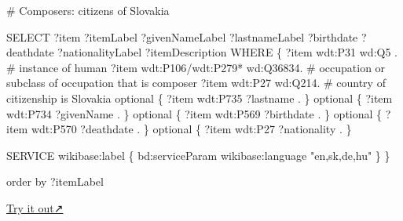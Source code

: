\documentclass[
  letterpaper,
  DIV=11,
  numbers=noendperiod]{scrreprt}
\newenvironment{Shaded}{\begin{snugshade}}{\end{snugshade}}
\newcommand{\CommentTok}[1]{\textcolor[rgb]{0.37,0.37,0.37}{#1}}
\newcommand{\NormalTok}[1]{\textcolor[rgb]{0.00,0.23,0.31}{#1}}
\newcommand{\SpecialCharTok}[1]{\textcolor[rgb]{0.37,0.37,0.37}{#1}}
\newcommand{\StringTok}[1]{\textcolor[rgb]{0.13,0.47,0.30}{#1}}
\begin{document}
\begin{Shaded}
\begin{Highlighting}[]
\CommentTok{\# Composers: citizens of Slovakia}

\NormalTok{SELECT ?item ?itemLabel  ?givenNameLabel ?lastnameLabel ?birthdate ?deathdate ?nationalityLabel ?itemDescription WHERE \{}
\NormalTok{    ?item wdt}\SpecialCharTok{:}\NormalTok{P31 wd}\SpecialCharTok{:}\NormalTok{Q5 .                }\CommentTok{\# instance of human}
\NormalTok{    ?item wdt}\SpecialCharTok{:}\NormalTok{P106}\SpecialCharTok{/}\NormalTok{wdt}\SpecialCharTok{:}\NormalTok{P279}\SpecialCharTok{*}\NormalTok{ wd}\SpecialCharTok{:}\NormalTok{Q36834.  }\CommentTok{\# occupation or subclass of occupation that is composer}
\NormalTok{    ?item wdt}\SpecialCharTok{:}\NormalTok{P27 wd}\SpecialCharTok{:}\NormalTok{Q214.               }\CommentTok{\# country of citizenship is Slovakia  }
\NormalTok{    optional \{ ?item wdt}\SpecialCharTok{:}\NormalTok{P735 ?lastname . \}}
\NormalTok{    optional \{ ?item wdt}\SpecialCharTok{:}\NormalTok{P734 ?givenName . \}}
\NormalTok{    optional \{ ?item wdt}\SpecialCharTok{:}\NormalTok{P569 ?birthdate . \}}
\NormalTok{    optional \{ ?item wdt}\SpecialCharTok{:}\NormalTok{P570 ?deathdate . \}}
\NormalTok{    optional \{ ?item wdt}\SpecialCharTok{:}\NormalTok{P27 ?nationality . \}}

\NormalTok{  SERVICE wikibase}\SpecialCharTok{:}\NormalTok{label \{ bd}\SpecialCharTok{:}\NormalTok{serviceParam wikibase}\SpecialCharTok{:}\NormalTok{language }\StringTok{"en,sk,de,hu"}\NormalTok{ \}}
\NormalTok{\}}

\NormalTok{order by ?itemLabel}
\end{Highlighting}
\end{Shaded}

\href{https://query.wikidata.org/\#\%23\%20Composers\%3A\%20citizens\%20of\%20Slovakia\%0A\%0ASELECT\%20\%3Fitem\%20\%3FitemLabel\%20\%20\%3FgivenNameLabel\%20\%3FlastnameLabel\%20\%3Fbirthdate\%20\%3Fdeathdate\%20\%3FnationalityLabel\%20\%3FitemDescription\%20WHERE\%20\%7B\%0A\%20\%20\%20\%20\%3Fitem\%20wdt\%3AP31\%20wd\%3AQ5\%20.\%20\%20\%20\%20\%20\%20\%20\%20\%20\%20\%20\%20\%20\%20\%20\%20\%23\%20instance\%20of\%20human\%0A\%20\%20\%20\%20\%3Fitem\%20wdt\%3AP106\%2Fwdt\%3AP279\%2a\%20wd\%3AQ36834.\%20\%20\%23\%20occupation\%20or\%20subclass\%20of\%20occupation\%20that\%20is\%20composer\%0A\%20\%20\%20\%20\%3Fitem\%20wdt\%3AP27\%20wd\%3AQ214.\%20\%20\%20\%20\%20\%20\%20\%20\%20\%20\%20\%20\%20\%20\%20\%23\%20country\%20of\%20citizenship\%20is\%20Slovakia\%20\%20\%0A\%20\%20\%20\%20optional\%20\%7B\%20\%3Fitem\%20wdt\%3AP735\%20\%3Flastname\%20.\%20\%7D\%0A\%20\%20\%20\%20optional\%20\%7B\%20\%3Fitem\%20wdt\%3AP734\%20\%3FgivenName\%20.\%20\%7D\%0A\%20\%20\%20\%20optional\%20\%7B\%20\%3Fitem\%20wdt\%3AP569\%20\%3Fbirthdate\%20.\%20\%7D\%0A\%20\%20\%20\%20optional\%20\%7B\%20\%3Fitem\%20wdt\%3AP570\%20\%3Fdeathdate\%20.\%20\%7D\%0A\%20\%20\%20\%20optional\%20\%7B\%20\%3Fitem\%20wdt\%3AP27\%20\%3Fnationality\%20.\%20\%7D\%0A\%0A\%20\%20SERVICE\%20wikibase\%3Alabel\%20\%7B\%20bd\%3AserviceParam\%20wikibase\%3Alanguage\%20\%22en\%2Csk\%2Cde\%2Chu\%22\%20\%7D\%0A\%7D\%0A\%0Aorder\%20by\%20\%3FitemLabel}{Try
it out↗}
\end{document}
